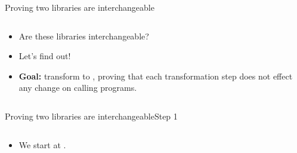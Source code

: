 \documentclass[aspectratio=169, lualatex, handout]{beamer}
\begin{document}
\begin{frame}{Proving two libraries are interchangeable}
	\begin{columns}[c]
		\begin{column}{0.5\textwidth}
			\begin{itemize}[<+->]
				\item Are these libraries interchangeable?
				\item Let's find out!
				\item \textbf{Goal:} transform  to , proving that each transformation step does not effect any change on calling programs.
			\end{itemize}
		\end{column}
		\begin{column}{0.5\textwidth}
			\begin{flushright}
			\end{flushright}
		\end{column}
	\end{columns}
\end{frame}

\begin{frame}{Proving two libraries are interchangeable}{Step 1}
	\begin{columns}[c]
		\begin{column}{0.5\textwidth}
			\begin{itemize}
				\item We start at .
			\end{itemize}
		\end{column}
		\begin{column}{0.5\textwidth}
			\begin{center}
			\end{center}
		\end{column}
	\end{columns}
\end{frame}
\end{document}

